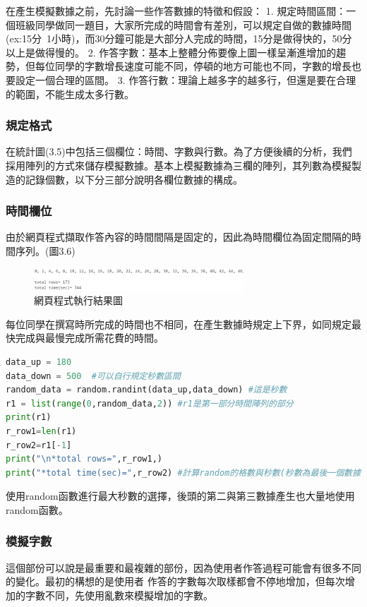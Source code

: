 在產生模擬數據之前，先討論一些作答數據的特徵和假設：
1. 規定時間區間：一個班級同學做同一題目，大家所完成的時間會有差別，可以規定自做的數據時間(ex:15分~1小時)，而30分鐘可能是大部分人完成的時間，15分是做得快的，50分以上是做得慢的。
2. 作答字數：基本上整體分佈要像上圖一樣呈漸進增加的趨勢，但每位同學的字數增長速度可能不同，停頓的地方可能也不同，字數的增長也要設定一個合理的區間。
3. 作答行數：理論上越多字的越多行，但還是要在合理的範圍，不能生成太多行數。

\subsubsection{規定格式}
在統計圖(3.5)中包括三個欄位：時間、字數與行數。為了方便後續的分析，我們採用陣列的方式來儲存模擬數據。基本上模擬數據為三欄的陣列，其列數為模擬製造的記錄個數，以下分三部分說明各欄位數據的構成。
\subsubsection{時間欄位}
由於網頁程式擷取作答內容的時間間隔是固定的，因此為時間欄位為固定間隔的時間序列。(圖3.6)
	\begin{figure}[H] %
	\centering %
	\includegraphics[width=0.7\textwidth]{3_2_1_3.png} %
	\caption{網頁程式執行結果圖} %
	\label{Fig.3.6} %
	\end{figure}
每位同學在撰寫時所完成的時間也不相同，在產生數據時規定上下界，如同規定最快完成與最慢完成所需花費的時間。

\begin{lstlisting}[language=Python,caption=時間欄位的模擬數據]
data_up = 180
data_down = 500  #可以自行規定秒數區間
random_data = random.randint(data_up,data_down) #這是秒數
r1 = list(range(0,random_data,2)) #r1是第一部分時間陣列的部分
print(r1)
r_row1=len(r1)
r_row2=r1[-1]
print("\n*total rows=",r_row1,)
print("*total time(sec)=",r_row2) #計算random的格數與秒數(秒數為最後一個數據)
\end{lstlisting}
使用random函數進行最大秒數的選擇，後頭的第二與第三數據產生也大量地使用random函數。

\subsubsection{模擬字數}
這個部份可以說是最重要和最複雜的部份，因為使用者作答過程可能會有很多不同的變化。最初的構想的是使用者
作答的字數每次取樣都會不停地增加，但每次增加的字數不同，先使用亂數來模擬增加的字數。

